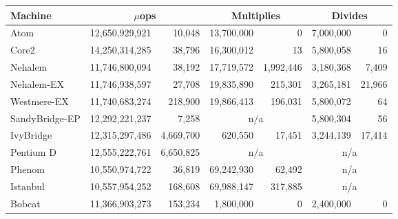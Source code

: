 \begin{tabular}{|l||r@{$\pm$}r||r@{$\pm$}r||r@{$\pm$}r|}

\hline
Machine   & \multicolumn{2}{c||}{$\mu$ops} & \multicolumn{2}{c||}{Multiplies} & \multicolumn{2}{c|}{Divides} \\

\hline
\hline

Atom           & 12,650,929,921 & 10,048 &  13,700,000 &  0     &   7,000,000 & 0      \\
\hline
Core2          & 14,250,314,285 & 38,796 &  16,300,012 & 13     &   5,800,058 & 16 \\
\hline
Nehalem        & 11,746,800,094 & 38,192 & 17,719,572 & 1,992,446 & 3,180,368 & 7,409    \\
\hline
Nehalem-EX     & 11,746,938,597 & 27,708 & 19,835,890 & 215,301   &  3,265,181 & 21,966    \\
\hline
Westmere-EX       & 11,740,683,274 & 218,900 & 19,866,413 & 196,031 & 5,800,072           &  64 \\
\hline
SandyBridge-EP  & 12,292,221,237 &  7,258 & \multicolumn{2}{c||}{n/a}   &  5,800,304 & 56    \\
\hline
IvyBridge      & 12,315,297,486 & 4,669,700 & 620,550    & 17,451           &  3,244,139          & 17,414 \\
\hline
Pentium D      & 12,555,222,761 & 6,650,825 & \multicolumn{2}{c||}{n/a} & \multicolumn{2}{c|}{n/a} \\
\hline
Phenom         & 10,550,974,722 & 36,819 &  69,242,930 & 62,492  & \multicolumn{2}{c|}{n/a} \\
\hline
Istanbul       & 10,557,954,252 & 168,608 &  69,988,147 & 317,885    & \multicolumn{2}{c|}{n/a} \\
\hline
Bobcat         & 11,366,903,273 & 153,234   &   1,800,000 & 0    & 2,400,000 & 0 \\
\hline
\end{tabular}
%

